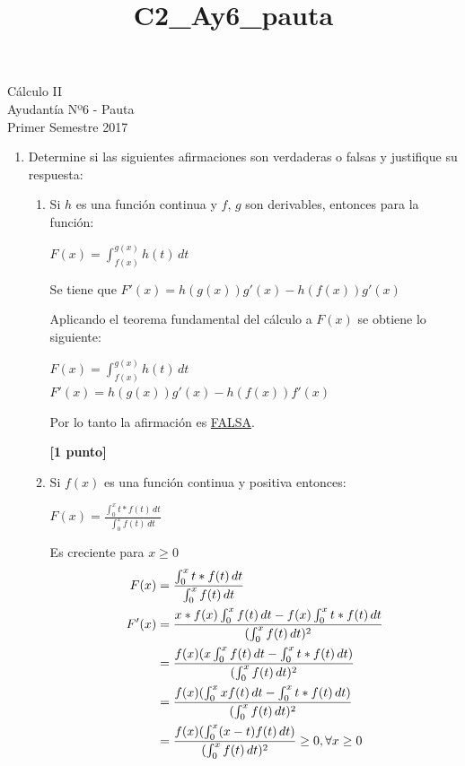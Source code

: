 \documentclass[letterpaper,10pt]{article}
\title{C2_Ay6_pauta}
\newcommand{\dis}{\displaystyle}
\begin{document}
\begin{center}
Cálculo II\\
Ayudantía Nº6 - Pauta\\
Primer Semestre 2017
\end{center}

\begin{enumerate}
\item Determine si las siguientes afirmaciones son verdaderas o falsas y justifique su respuesta:

\begin{enumerate}[label=\emph{\alph*)}]

\item Si $h$ es una función continua y $f$, $g$ son derivables, entonces para la función:\\
\begin{center}
$\dis F(x) = \int_{f(x)}^{g(x)} h(t)\, dt$
\end{center} 
Se tiene que $F'(x)=h(g(x))g'(x)-h(f(x))g'(x)$

Aplicando el teorema fundamental del cálculo a $F(x)$ se obtiene lo siguiente:

\begin{center}
$\dis F(x) = \int_{f(x)}^{g(x)} h(t)\, dt$\\
$F'(x)=h(g(x))g'(x)-h(f(x))f'(x)$
\end{center} 

Por lo tanto la afirmación es \underline{FALSA}.

\dotfill\textbf{[1 punto]}


\item Si $f(x)$ es una función continua y positiva entonces:
\begin{center}
$\dis F(x) = \frac{\int_{0}^{x} t * f(t)\, dt}{\int_{0}^{x} f(t)\, dt}$
\end{center} 
Es creciente para $x \geq 0$\\

\begin{align*}
 \dis  F(x)  &= \frac{\int_{0}^{x} t * f(t)\, dt}{\int_{0}^{x} f(t)\, dt}\\
 \dis  F'(x)  &= \frac{x*f(x)\int_{0}^{x} f(t)\, dt - f(x)\int_{0}^{x} t * f(t)\, dt}{(\int_{0}^{x} f(t)\, dt)^2}\\
 \dis &= \frac{f(x)(x\int_{0}^{x} f(t)\, dt - \int_{0}^{x} t * f(t)\, dt)}{(\int_{0}^{x} f(t)\, dt)^2}\\
 \dis &= \frac{f(x)(\int_{0}^{x} xf(t)\, dt - \int_{0}^{x} t * f(t)\, dt)}{(\int_{0}^{x} f(t)\, dt)^2}\\
 \dis &= \frac{f(x)(\int_{0}^{x} (x-t)f(t)\, dt)}{(\int_{0}^{x} f(t)\, dt)^2} \geq 0, \forall x \geq 0
\end{align*}


\end{enumerate}
\end{enumerate}
\end{document}

